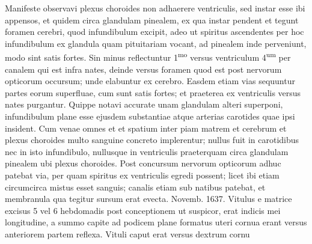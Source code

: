 \pstart%
Manifeste observavi plexus choroides non adhaerere ventriculis, sed instar
esse ibi appensos, et quidem circa glandulam pinealem, ex qua
instar pendent et tegunt foramen cerebri, quod infundibulum excipit, adeo ut spiritus ascendentes per hoc infundibulum ex glandula quam pituitariam vocant, ad pinealem inde perveniunt, modo sint satis fortes. Sin minus reflectuntur 1\textsuperscript{mo} versus ventriculum 4\textsuperscript{um} per canalem qui est infra nates, deinde versus foramen quod est post nervorum opticorum occursum; unde elabuntur ex cerebro.
Easdem etiam vias sequuntur partes eorum superfluae, cum sunt satis fortes; et praeterea ex ventriculis versus nates purgantur. Quippe notavi accurate unam glandulam alteri superponi, infundibulum plane esse ejusdem substantiae atque arterias carotides quae ipsi insident.
\pend%
\newpage
\pstart %
Cum venae omnes
et  et spatium inter piam matrem et cerebrum et plexus choroides multo sanguine concreto implerentur;
nullus fuit in carotidibus nec in isto infundibulo, nullusque in ventriculis praeterquam circa glandulam pinealem ubi plexus choroides.
Post concursum nervorum opticorum adhuc patebat via, per quam spiritus ex ventriculis egredi possent; licet ibi etiam circumcirca mistus esset sanguis; canalis etiam sub natibus patebat, et membranula qua tegitur sursum erat evecta.
\pend%
\vspace{1.0em}%
\pstart%
\noindent%
Novemb. 1637. Vitulus e matrice excisus 5 vel 6 hebdomadis post conceptionem ut suspicor, erat indicis mei longitudine, a summo capite ad podicem plane formatus uteri cornua erant versus anteriorem partem reflexa. Vituli caput erat versus dextrum cornu%

